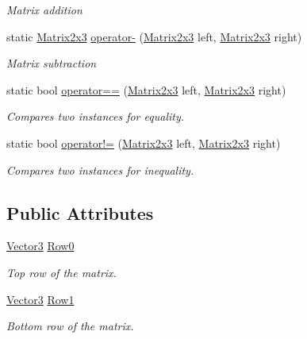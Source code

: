 \begin{DoxyCompactItemize}
\begin{DoxyCompactList}\small\item\em Matrix addition \end{DoxyCompactList}\item 
static \hyperlink{struct_open_t_k_1_1_matrix2x3}{Matrix2x3} \hyperlink{struct_open_t_k_1_1_matrix2x3_ad5c462dbd14e30bcaaf0eb9b3998b455}{operator-\/} (\hyperlink{struct_open_t_k_1_1_matrix2x3}{Matrix2x3} left, \hyperlink{struct_open_t_k_1_1_matrix2x3}{Matrix2x3} right)
\begin{DoxyCompactList}\small\item\em Matrix subtraction \end{DoxyCompactList}\item 
static bool \hyperlink{struct_open_t_k_1_1_matrix2x3_a5deb68a86dd1292e8d9b078f69f3c1ab}{operator==} (\hyperlink{struct_open_t_k_1_1_matrix2x3}{Matrix2x3} left, \hyperlink{struct_open_t_k_1_1_matrix2x3}{Matrix2x3} right)
\begin{DoxyCompactList}\small\item\em Compares two instances for equality. \end{DoxyCompactList}\item 
static bool \hyperlink{struct_open_t_k_1_1_matrix2x3_ad7346d6c563d317f42794fa6ce38db9f}{operator!=} (\hyperlink{struct_open_t_k_1_1_matrix2x3}{Matrix2x3} left, \hyperlink{struct_open_t_k_1_1_matrix2x3}{Matrix2x3} right)
\begin{DoxyCompactList}\small\item\em Compares two instances for inequality. \end{DoxyCompactList}\end{DoxyCompactItemize}
\subsection*{Public Attributes}
\begin{DoxyCompactItemize}
\item 
\hyperlink{struct_open_t_k_1_1_vector3}{Vector3} \hyperlink{struct_open_t_k_1_1_matrix2x3_a2ad60d16151058fb45a911b1362fd66f}{Row0}
\begin{DoxyCompactList}\small\item\em Top row of the matrix. \end{DoxyCompactList}\item 
\hyperlink{struct_open_t_k_1_1_vector3}{Vector3} \hyperlink{struct_open_t_k_1_1_matrix2x3_a1e0c5f4be418cca30e3fb140e37c71c3}{Row1}
\begin{DoxyCompactList}\small\item\em Bottom row of the matrix. \end{DoxyCompactList}\end{DoxyCompactItemize}
